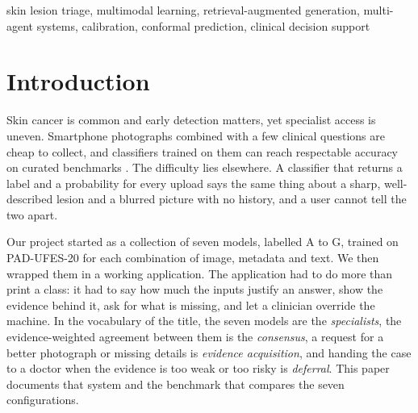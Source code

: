 \documentclass[conference]{IEEEtran}
\begin{document}
\begin{abstract}
We built DERMA-GUARD to answer a narrow question: what should a skin-lesion triage tool do when its evidence is weak? The system combines seven classifiers that cover every combination of a smartphone photograph, structured patient details and a free-text description, an evidence manager that weights each input by its quality, reliability and diagnostic utility, and a four-level consensus rule that chooses between accepting, arbitrating, acquiring more evidence and escalating. Six cooperating agents add retrieval-augmented generation over a dermatology knowledge base and over documented look-alike patients whose photographs are shown beside the new case, and every agent receives an explicit score. A patient portal routes each case to a doctor, who records the final decision. On the PAD-UFES-20 benchmark partition (six classes, 459 test lesions) the seven models reach 83.66\% (image), 86.27\% (metadata), 85.19\% (text), 86.27\% (image + metadata), 89.98\% (image + text), 85.40\% (text + metadata) and 87.80\% (all three inputs) accuracy, with macro AUC between 0.9948 and 0.9982. Nevi, seborrheic keratoses and melanomas are recognised without a miss by every model, and the remaining errors concentrate in basal cell carcinoma, actinic keratosis and squamous cell carcinoma.
\end{abstract}

\begin{IEEEkeywords}
skin lesion triage, multimodal learning, retrieval-augmented generation, multi-agent systems, calibration, conformal prediction, clinical decision support
\end{IEEEkeywords}

\section{Introduction}
Skin cancer is common and early detection matters, yet specialist access is uneven. Smartphone photographs combined with a few clinical questions are cheap to collect, and classifiers trained on them can reach respectable accuracy on curated benchmarks \cite{esteva2017,pacheco2020}. The difficulty lies elsewhere. A classifier that returns a label and a probability for every upload says the same thing about a sharp, well-described lesion and a blurred picture with no history, and a user cannot tell the two apart.

Our project started as a collection of seven models, labelled A to G, trained on PAD-UFES-20 \cite{pacheco2020} for each combination of image, metadata and text. We then wrapped them in a working application. The application had to do more than print a class: it had to say how much the inputs justify an answer, show the evidence behind it, ask for what is missing, and let a clinician override the machine. In the vocabulary of the title, the seven models are the \emph{specialists}, the evidence-weighted agreement between them is the \emph{consensus}, a request for a better photograph or missing details is \emph{evidence acquisition}, and handing the case to a doctor when the evidence is too weak or too risky is \emph{deferral}. This paper documents that system and the benchmark that compares the seven configurations.
\end{document}
